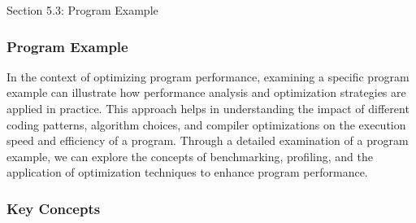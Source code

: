 \begin{notes}{Section 5.3: Program Example}
    \subsubsection*{Program Example}

    In the context of optimizing program performance, examining a specific program example can illustrate how performance analysis and optimization strategies are applied in practice. This approach 
    helps in understanding the impact of different coding patterns, algorithm choices, and compiler optimizations on the execution speed and efficiency of a program. Through a detailed examination of 
    a program example, we can explore the concepts of benchmarking, profiling, and the application of optimization techniques to enhance program performance. \vspace*{1em}
    
    \subsubsection*{Key Concepts}
    

\end{notes}
